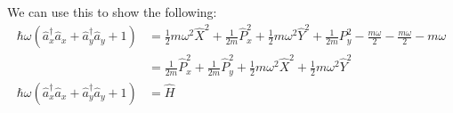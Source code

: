 \documentclass{article}
\begin{document}
We can use this to show the following:
\begin{align*}
    ℏω(\hat{a}^{†}_x \hat{a}_x + \hat{a}^{†}_y \hat{a}_y + 1) &= \frac{1}{2}mω^2 \hat{X}^2 + \frac{1}{2m} \hat{P}_x^2 + \frac{1}{2}mω^2 \hat{Y}^2 + \frac{1}{2m}P_y^2 - \frac{mω}{2} - \frac{mω}{2} - mω \\
    &= \frac{1}{2m}\hat{P}_x^2 + \frac{1}{2m}\hat{P}_y^2 + \frac{1}{2}mω^2 \hat{X}^2 + \frac{1}{2}mω^2 \hat{Y}^2 \\ 
    ℏω(\hat{a}^{†}_x \hat{a}_x + \hat{a}^{†}_y \hat{a}_y + 1) &= \hat{H}
\end{align*}
\end{document}
